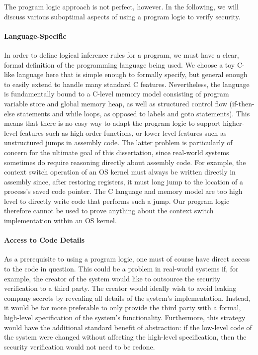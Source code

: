 The program logic approach is not perfect, however. In the following, we will
discuss various suboptimal aspects of using a program logic to verify security.

\paragraph{Language-Specific}
In order to define logical inference rules for a program, we must have a
clear, formal definition of the programming language being used. We choose
a toy C-like language here that is simple enough to formally specify, but
general enough to easily extend to handle many standard C features.
Nevertheless, the language is fundamentally bound to a C-level memory model
consisting of program variable store and global memory heap, as well as
structured control flow (if-then-else statements and while loops, as opposed to
labels and goto statements). This means that there is no easy way to
adapt the program logic to support higher-level features such as high-order
functions, or lower-level features such as unstructured jumps in assembly code. 
The latter problem is particularly of concern for the ultimate goal of
this dissertation, since real-world systems
sometimes do require reasoning directly about assembly code. For
example, the context switch operation of an OS kernel must always be
written directly in assembly since, after restoring registers, it must long 
jump to the location of a process's saved code pointer. The C language and
memory model are too high level to directly write code that performs such
a jump. Our program logic therefore cannot be used to prove anything about
the context switch implementation within an OS kernel.

\paragraph{Access to Code Details}
As a prerequisite to using a program logic, one must of course have direct 
access to the code in question. This could be a problem in real-world
systems if, for example, the creator of the system would like to outsource
the security verification to a third party. The creator would ideally wish
to avoid leaking company secrets by revealing all details of the system's 
implementation. Instead, it would be far more preferable
to only provide the third party with a formal, high-level specification of
the system's functionality. Furthermore, this strategy would have the additional
standard benefit of abstraction: if the low-level code of the system were changed 
without affecting the high-level specification, then the security verification
would not need to be redone.

